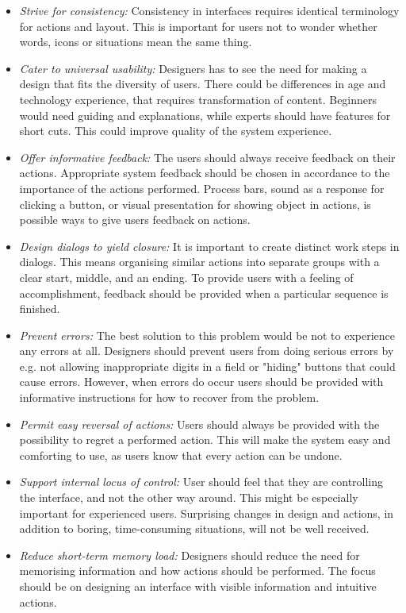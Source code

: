 \begin{itemize} 
\item \emph{Strive for consistency:} Consistency in interfaces requires identical terminology for actions and layout. This is important for users not to wonder whether words, icons or situations mean the same thing. 
\item \emph{Cater to universal usability:} Designers has to see the need for making a design that fits the diversity of users. There could be differences in age and technology experience, that requires transformation of content. Beginners would need guiding and explanations, while experts should have features for short cuts. This could improve quality of the system experience. 
\item \emph{Offer informative feedback:} The users should always receive feedback on their actions. Appropriate system feedback should be chosen in accordance to the importance of the actions performed. Process bars, sound as a response for clicking a button, or visual presentation for showing object in actions, is possible ways to give users feedback on actions.  
\item \emph{Design dialogs to yield closure:} It is important to create distinct work steps in dialogs. This means organising similar actions into separate groups with a clear start, middle, and an ending. To provide users with a feeling of accomplishment, feedback should be provided when a particular sequence is finished.     
\item \emph{Prevent errors:} The best solution to this problem would be not to experience any errors at all. Designers should prevent users from doing serious errors by e.g. not allowing inappropriate digits in a field or "hiding" buttons that could cause errors. However, when errors do occur users should be provided with informative instructions for how to recover from the problem.   
\item \emph{Permit easy reversal of actions:} Users should always be provided with the possibility to regret a performed action. This will make the system easy and comforting to use, as users know that every action can be undone. 
\item \emph{Support internal locus of control:} User should feel that they are controlling the interface, and not the other way around. This might be especially important for experienced users. Surprising changes in design and actions, in addition to boring, time-consuming situations, will not be well received. 
\item \emph{Reduce short-term memory load:} Designers should reduce the need for memorising information and how actions should be performed. The focus should be on designing an interface with visible information and intuitive actions.
\end{itemize}

